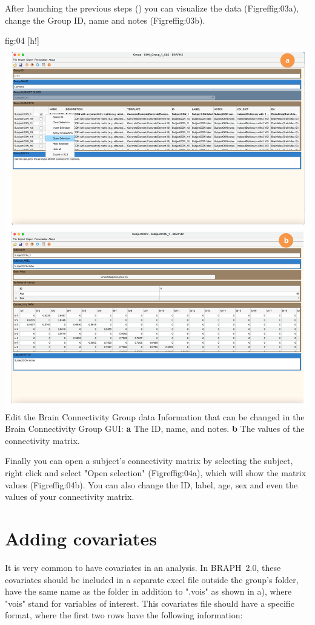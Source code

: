 \documentclass[justified]{tufte-handout}
\begin{document}
After launching the previous steps () you can visualize the data (Figref{fig:03}a), change the Group ID, name and notes (Figref{fig:03}b). 

	{fig:04}
	{
	[h!]
	\includegraphics{fig04.png}
	}
	{Edit the Brain Connectivity Group data}
	{
	Information that can be changed in the Brain Connectivity Group GUI: 
	{\bf a} The ID, name, and notes.
	{\bf b} The values of the connectivity matrix.
	}

Finally you can open a subject's connectivity matrix by selecting the subject, right click and select "Open selection" (Figref{fig:04}a), which will show the matrix values (Figref{fig:04}b). You can also change the ID, label, age, sex and even the values of your connectivity matrix.
	

\section{Adding covariates}

It is very common to have covariates in an analysis. In BRAPH~2.0, these covariates should be included in a separate excel file outside the group's folder, have the same name as the folder in addition to ".vois" as shown in a), where "vois" stand for variables of interest. This covariates file should have a specific format, where the first two rows have the following information:
\end{document}
